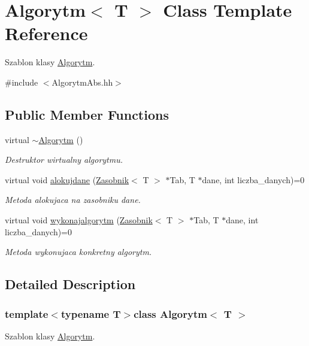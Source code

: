 \hypertarget{a00001}{}\section{Algorytm$<$ T $>$ Class Template Reference}
\label{a00001}


Szablon klasy \hyperlink{a00001}{Algorytm}.  




{\ttfamily \#include $<$Algorytm\+Abs.\+hh$>$}

\subsection*{Public Member Functions}
\begin{DoxyCompactItemize}
\item 
virtual \hyperlink{a00001_a03e656bf3d65ffb3428bd153c9faaadb}{$\sim$\+Algorytm} ()
\begin{DoxyCompactList}\small\item\em Destruktor wirtualny algorytmu. \end{DoxyCompactList}\item 
virtual void \hyperlink{a00001_a1e83fd87a20fd0a13ebbf1c81e457b61}{alokujdane} (\hyperlink{a00017}{Zasobnik}$<$ T $>$ $\ast$Tab, T $\ast$dane, int liczba\+\_\+danych)=0
\begin{DoxyCompactList}\small\item\em Metoda alokujaca na zasobniku dane. \end{DoxyCompactList}\item 
virtual void \hyperlink{a00001_ae97a52b1a728be1a819c9e9815f424e7}{wykonajalgorytm} (\hyperlink{a00017}{Zasobnik}$<$ T $>$ $\ast$Tab, T $\ast$dane, int liczba\+\_\+danych)=0
\begin{DoxyCompactList}\small\item\em Metoda wykonujaca konkretny algorytm. \end{DoxyCompactList}\end{DoxyCompactItemize}


\subsection{Detailed Description}
\subsubsection*{template$<$typename T$>$class Algorytm$<$ T $>$}

Szablon klasy \hyperlink{a00001}{Algorytm}. 

